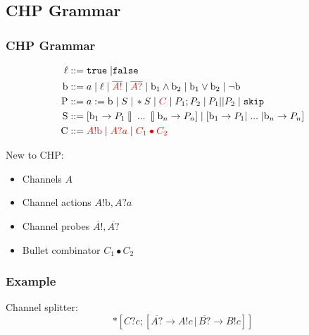 \documentclass[compress]{beamer}
\begin{document}
\subsection{CHP Grammar}
\begin{frame}
    \frametitle{CHP Grammar}
    \begin{align*}
        \ell & ::= \mathtt{true} \; | \mathtt{false} \\
        \mathrm{b} & ::= a \; | \; \ell \; | \; {\color{red} \overline{A!}} \; | \; {\color{red} \overline{A?}} \; | \; \mathrm{b}_1 \wedge \mathrm{b}_2 \; | \; \mathrm{b}_1 \vee \mathrm{b}_2 \; | \; \lnot \mathrm{b} \\
        \mathrm{P} & ::= a := \mathrm{b} \; | \; S \; | \, *S \; | \; {\color{red} C} \; | \; P_1; P_2 \; | \: P_1 || P_2 \; | \; \mathtt{skip} \\
        \mathrm{S} & ::= [ \mathrm{b}_1 \rightarrow P_1 \talloblong \; ... \; \talloblong \mathrm{b}_n \rightarrow P_n ] \; | \; [ \mathrm{b}_1 \rightarrow P_1 | \; ... \; | \mathrm{b}_n \rightarrow P_n ] \\
        \mathrm{C} & ::= {\color{red} A!\mathrm{b}} \; | \; {\color{red} A?a} \; | \; {\color{red} C_1 \bullet C_2}
    \end{align*}
\end{frame}
\begin{frame}
    New to CHP:
    \begin{itemize}
        \item Channels $A$
        \item Channel actions $A!\mathrm{b}, A?a$
        \item Channel probes $\overline{A!}, \overline{A?}$
        \item \color{lightgray} Bullet combinator $C_1 \bullet C_2$
    \end{itemize}
\end{frame}
\begin{frame}
    \frametitle{Example}
    Channel splitter:
    {\small $$*[C?c; [\overline{A?} \rightarrow A!c \, | \, \overline{B?} \rightarrow B!c]]$$}
\end{frame}
\end{document}
